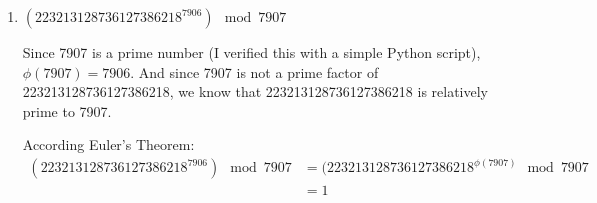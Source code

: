 \documentclass[11pt]{article}
\begin{document}
\begin{enumerate}
\item $(223213128736127386218^{7906}) \mod 7907$

  Since 7907 is a prime number (I verified this with a simple Python
  script), $\phi(7907) = 7906$. And since 7907 is not
  a prime factor of 223213128736127386218, we know that
  223213128736127386218 is relatively prime to 7907.

  According Euler's Theorem:
  \begin{align}
    (223213128736127386218^{7906}) \mod 7907 &=
    (223213128736127386218^{\phi(7907)} \mod 7907\\
    &= 1
  \end{align}

\end{enumerate}
\end{document}

